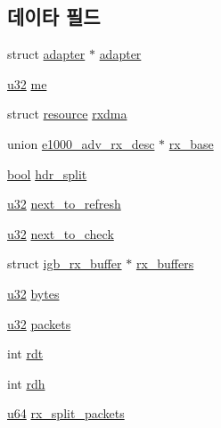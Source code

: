 \subsection*{데이타 필드}
\begin{DoxyCompactItemize}
\item 
struct \hyperlink{structadapter}{adapter} $\ast$ \hyperlink{structrx__ring_a807e6014970a3d469e197cd9ec25229c}{adapter}
\item 
\hyperlink{lib_2igb_2e1000__osdep_8h_a64e91c10a0d8fb627e92932050284264}{u32} \hyperlink{structrx__ring_af754e6af13b532f2bebcaa3828ea795c}{me}
\item 
struct \hyperlink{structresource}{resource} \hyperlink{structrx__ring_a7b5f7d41a39b44612fd251f290500ba5}{rxdma}
\item 
union \hyperlink{unione1000__adv__rx__desc}{e1000\+\_\+adv\+\_\+rx\+\_\+desc} $\ast$ \hyperlink{structrx__ring_a40ec79b3b6a780e7f5c90dea8b3160bf}{rx\+\_\+base}
\item 
\hyperlink{avb__gptp_8h_af6a258d8f3ee5206d682d799316314b1}{bool} \hyperlink{structrx__ring_adad11ae5252d67c74a0c96122e7909c8}{hdr\+\_\+split}
\item 
\hyperlink{lib_2igb_2e1000__osdep_8h_a64e91c10a0d8fb627e92932050284264}{u32} \hyperlink{structrx__ring_aab3e5ae9f841cbc34fddab6abd9ed519}{next\+\_\+to\+\_\+refresh}
\item 
\hyperlink{lib_2igb_2e1000__osdep_8h_a64e91c10a0d8fb627e92932050284264}{u32} \hyperlink{structrx__ring_a3a6765383612ad483dfc252f8a16a87d}{next\+\_\+to\+\_\+check}
\item 
struct \hyperlink{structigb__rx__buffer}{igb\+\_\+rx\+\_\+buffer} $\ast$ \hyperlink{structrx__ring_abe41cfe713ffac28a8f678c51082df25}{rx\+\_\+buffers}
\item 
\hyperlink{lib_2igb_2e1000__osdep_8h_a64e91c10a0d8fb627e92932050284264}{u32} \hyperlink{structrx__ring_a7056b21e5e7773c9205b38f00a3a75c2}{bytes}
\item 
\hyperlink{lib_2igb_2e1000__osdep_8h_a64e91c10a0d8fb627e92932050284264}{u32} \hyperlink{structrx__ring_a5ff69346aaa72fb9bf0c095156ddccbb}{packets}
\item 
int \hyperlink{structrx__ring_a3742516ecd0d67208a44cd784dc18e9d}{rdt}
\item 
int \hyperlink{structrx__ring_a8bdeae62f96fbc60ee3fa9aefb4aa66a}{rdh}
\item 
\hyperlink{lib_2igb_2e1000__osdep_8h_a1d8f78f95a414480659f3182e6067b80}{u64} \hyperlink{structrx__ring_a531d11bd600d2183a8bee4aa70c0652e}{rx\+\_\+split\+\_\+packets}

\end{DoxyCompactItemize}
